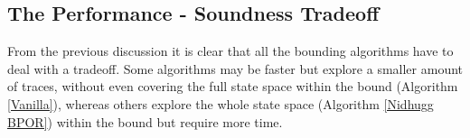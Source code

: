 \subsection {The Performance - Soundness Tradeoff}

From the previous discussion it is clear that all the bounding algorithms have to deal with a tradeoff. Some algorithms may be faster but
explore a smaller amount of traces, without even covering the full state space within the bound (Algorithm \ref{Vanilla}), 
whereas others explore the whole state space (Algorithm \ref{Nidhugg BPOR}) within the bound but require more time.
